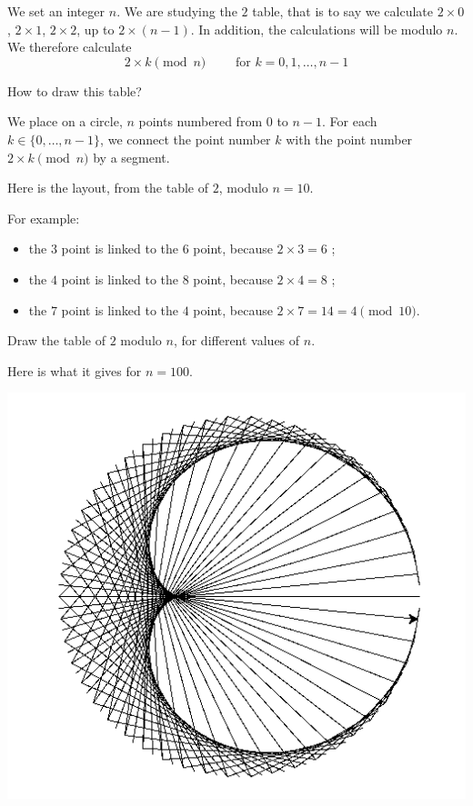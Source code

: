 \documentclass[11pt,class=report,crop=false]{standalone}
\begin{document}
\begin{activite}



We set an integer $n$. We are studying the $2$ table, that is to say 
we calculate $2 \times 0$, $2\times 1$, $2 \times 2$, up to $2 \times (n-1)$. In addition, the calculations will be modulo $n$. We therefore calculate  
$$2 \times k \pmod{n} \qquad \text{ for } k=0,1,\ldots,n-1$$

How to draw this table?

We place on a circle, $n$ points numbered from $0$ to $n-1$.
For each $k\in \{0,\ldots,n-1\}$, we connect the point number $k$
with the point number $2\times k \pmod{n}$ by a segment. 

Here is the layout, from the table of $2$, modulo $n=10$.



For example:
\begin{itemize}
  \item the $3$ point is linked to the $6$ point, because $2 \times 3 = 6$ ;
  \item the $4$ point is linked to the $8$ point, because $2 \times 4 = 8$ ;
  \item the $7$ point is linked to the $4$ point, because $2 \times 7 = 14 = 4 \pmod{10}$.
\end{itemize}

\bigskip

Draw the table of $2$ modulo $n$, for different values of $n$.

Here is what it gives for $n=100$.

\begin{center}
\includegraphics[scale=\myscale,scale=0.5]{screen-turtle-5b}
\end{center}


\end{activite}
\end{document}
